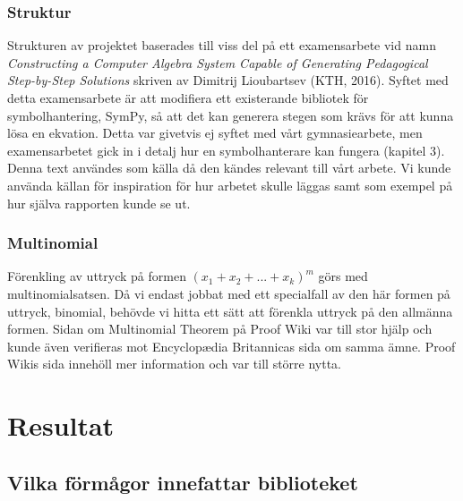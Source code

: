 \documentclass[12pt,a4paper]{article}
\begin{document}
\subsubsection{Struktur}
Strukturen av projektet baserades till viss del på ett examensarbete vid namn \textit{Constructing a Computer Algebra System Capable of Generating Pedagogical Step-by-Step Solutions} skriven av Dimitrij Lioubartsev (KTH, 2016). Syftet med detta examensarbete är att modifiera ett existerande bibliotek för symbolhantering, SymPy, så att det kan generera stegen som krävs för att kunna lösa en ekvation. Detta var givetvis ej syftet med vårt gymnasiearbete, men examensarbetet gick in i detalj hur en symbolhanterare kan fungera (kapitel 3). Denna text användes som källa då den kändes relevant till vårt arbete. Vi kunde använda källan för inspiration för hur arbetet skulle läggas samt som exempel på hur själva rapporten kunde se ut.

\subsubsection{Multinomial}
Förenkling av uttryck på formen \((x_{1}+x_{2}+...+x_{k})^{m}\) görs med multinomialsatsen. Då vi endast jobbat med ett specialfall av den här formen på uttryck, binomial, behövde vi hitta ett sätt att förenkla uttryck på den allmänna formen. Sidan om Multinomial Theorem på Proof Wiki var till stor hjälp och kunde även verifieras mot Encyclopædia Britannicas sida om samma ämne. Proof Wikis sida innehöll mer information och var till större nytta.

\section{Resultat}
\subsection{Vilka förmågor innefattar biblioteket}
\end{document}
